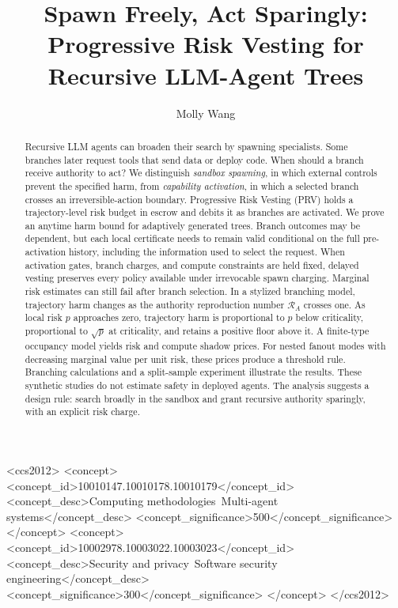 \documentclass[sigconf,nonacm]{acmart}
\title[Progressive Risk Vesting]{Spawn Freely, Act Sparingly:
Progressive Risk Vesting for Recursive LLM-Agent Trees}
\author{Molly Wang}
\affiliation{%
  \institution{Imperial Business School}
  \city{London}
  \country{United Kingdom}}
\newcommand{\RA}{\mathcal{R}_{\!A}}
\newcommand{\prv}{\textsc{PRV}}
\begin{document}
\begin{abstract}
Recursive LLM agents can broaden their search by spawning specialists.  Some branches later
request tools that send data or deploy code.  When should a branch receive authority to act?  We
distinguish \emph{sandbox spawning}, in which external controls prevent the specified harm, from
\emph{capability activation}, in which a selected branch crosses an irreversible-action boundary.
Progressive Risk Vesting (\prv{}) holds a trajectory-level risk budget in escrow and debits it as
branches are activated.  We prove an anytime harm bound for adaptively generated trees.  Branch
outcomes may be dependent, but each local certificate needs to remain valid conditional on the
full pre-activation history, including the information used to select the request.  When
activation gates, branch charges, and compute constraints are held fixed, delayed vesting
preserves every policy available under irrevocable spawn charging.  Marginal risk estimates can
still fail after branch selection.  In a stylized branching model, trajectory harm changes as the
authority reproduction number $\RA$ crosses one.  As local risk $p$ approaches zero, trajectory
harm is proportional to $p$ below criticality, proportional to $\sqrt p$ at criticality, and
retains a positive floor above it.  A finite-type occupancy model yields risk and compute shadow
prices.  For nested fanout modes with decreasing marginal value per unit risk, these prices
produce a threshold rule.  Branching calculations and a split-sample experiment illustrate the
results.  These synthetic studies do not estimate safety in deployed agents.  The analysis
suggests a design rule: search broadly in the sandbox and grant recursive authority sparingly,
with an explicit risk charge.
\end{abstract}

\begin{CCSXML}
<ccs2012>
 <concept>
  <concept_id>10010147.10010178.10010179</concept_id>
  <concept_desc>Computing methodologies~Multi-agent systems</concept_desc>
  <concept_significance>500</concept_significance>
 </concept>
 <concept>
  <concept_id>10002978.10003022.10003023</concept_id>
  <concept_desc>Security and privacy~Software security engineering</concept_desc>
  <concept_significance>300</concept_significance>
 </concept>
</ccs2012>
\end{CCSXML}

\end{document}
